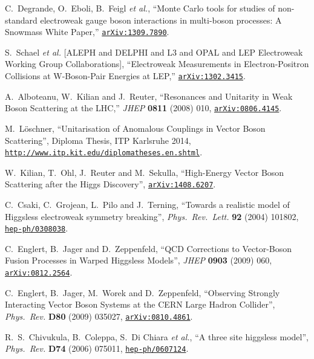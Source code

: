 \documentclass[english,12pt]{article}
\begin{document}
\begin{thebibliography}{10}
  C.~Degrande, O.~Eboli, B.~Feigl {\it et al.},
  ``Monte Carlo tools for studies of non-standard electroweak gauge boson interactions in multi-boson processes: A Snowmass White Paper,''
  \href{http://arxiv.org/abs/1309.7890}{{\tt arXiv:1309.7890}}.

  S.~Schael {\it et al.}  [ALEPH and DELPHI and L3 and OPAL and LEP Electroweak Working Group Collaborations],
  ``Electroweak Measurements in Electron-Positron Collisions at W-Boson-Pair Energies at LEP,''
  \href{http://arxiv.org/abs/1302.3415}{{\tt arXiv:1302.3415}}.

  A.~Alboteanu, W.~Kilian and J.~Reuter,
  ``Resonances and Unitarity in Weak Boson Scattering at the LHC,''
  {\em JHEP} {\bf 0811} (2008) 010,
  \href{http://arxiv.org/abs/0806.4145}{{\tt arXiv:0806.4145}}.

M.~L\"oschner, ``Unitarisation of Anomalous Couplings 
in Vector Boson Scattering'', {Diploma Thesis, ITP Karlsruhe 2014}, 
\href{http://www.itp.kit.edu/diplomatheses.en.shtml}{{\tt http://www.itp.kit.edu/diplomatheses.en.shtml}}.

W.~Kilian, T.~Ohl, J.~Reuter and M.~Sekulla,
``{High-Energy Vector Boson Scattering after the Higgs Discovery}'',
 \href{http://arxiv.org/abs/1408.6207}{{\tt arXiv:1408.6207}}.

C.~Csaki, C.~Grojean, L.~Pilo and J.~Terning, ``{Towards a realistic model of
  Higgsless electroweak symmetry breaking}'', {\em Phys.\ Rev.\ Lett.} {\bf 92}
  (2004) 101802,
\href{http://www.arXiv.org/abs/hep-ph/0308038}{{\tt hep-ph/0308038}}.

  C.~Englert, B.~Jager and D.~Zeppenfeld,
  ``QCD Corrections to Vector-Boson Fusion Processes in Warped Higgsless Models'',
  {\em JHEP} {\bf 0903 } (2009) 060,
 \href{http://arxiv.org/abs/0812.2564} {{\tt arXiv:0812.2564}}.

  C.~Englert, B.~Jager, M.~Worek and D.~Zeppenfeld,
  ``{Observing Strongly Interacting Vector Boson Systems at the CERN Large
  Hadron Collider}'',
  {\em Phys.\ Rev.} {\bf D80} (2009) 035027,
  \href{http://arxiv.org/abs/0810.4861}{{\tt arXiv:0810.4861}}.
  
  R.~S.~Chivukula, B.~Coleppa, S.~Di Chiara {\it et al.},
  ``{A three site higgsless model}'',
  {\em Phys.\ Rev.} {\bf D74} (2006) 075011,
\href{http://www.arXiv.org/abs/hep-ph/0607124}{{\tt hep-ph/0607124}}.
  

\end{thebibliography}
\end{document}
